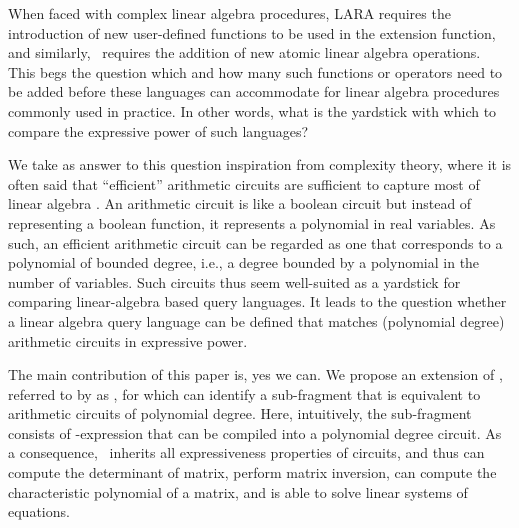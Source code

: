 When faced with complex linear algebra procedures, LARA requires the introduction of new user-defined functions to be used in the extension function, and similarly, \lang\ requires the addition of new atomic linear algebra operations. This begs the question which and how many such functions or operators need to be added before these languages can accommodate for 
linear algebra procedures commonly used in practice. In other words, what is the yardstick with which to compare the expressive power of such languages? 

We take as answer to this question inspiration from complexity theory, where it is often said that ``efficient'' arithmetic circuits are sufficient to capture most of linear algebra \cite{}. An arithmetic circuit is like a boolean circuit but instead of representing a boolean function, it represents a polynomial in real variables. As such, an efficient arithmetic circuit can be regarded as one that corresponds to a polynomial of bounded degree, i.e., a degree bounded by a polynomial in the number of variables. Such circuits thus seem well-suited as a yardstick for comparing  linear-algebra based query languages. It leads to the question whether a linear algebra query language can be defined that matches (polynomial degree) arithmetic circuits in expressive power.

The main contribution of this paper is, yes we can. We propose an extension of \lang, referred to by as \langfor, for which can identify a sub-fragment that is equivalent to arithmetic circuits of polynomial degree. Here, intuitively, the sub-fragment consists of \langfor-expression that can be compiled into a polynomial degree circuit. As a consequence, \langfor\ inherits all expressiveness properties of circuits, and thus can compute the determinant of matrix, perform matrix inversion, can compute the characteristic polynomial of a matrix, and is able to solve linear systems of equations.

